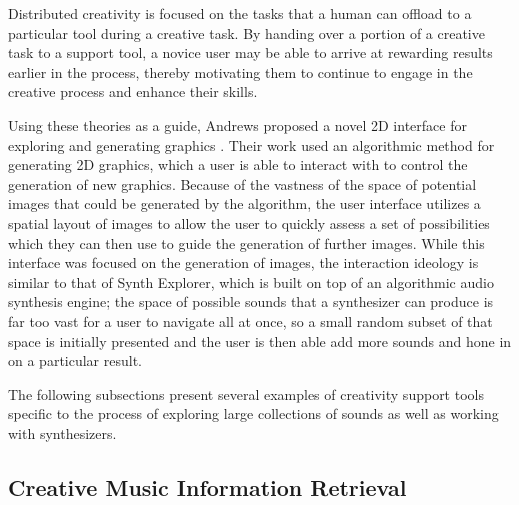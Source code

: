 Distributed creativity is focused on the tasks that a human can offload to a particular tool during a creative task. By handing over a portion of a creative task to a support tool, a novice user may be able to arrive at rewarding results earlier in the process, thereby motivating them to continue to engage in the creative process and enhance their skills.

Using these theories as a guide, Andrews proposed a novel 2D interface for exploring and generating graphics \cite{10.1145/3325480.3325506}. Their work used an algorithmic method for generating 2D graphics, which a user is able to interact with to control the generation of new graphics. Because of the vastness of the space of potential images that could be generated by the algorithm, the user interface utilizes a spatial layout of images to allow the user to quickly assess a set of possibilities which they can then use to guide the generation of further images. While this interface was focused on the generation of images, the interaction ideology is similar to that of Synth Explorer, which is built on top of an algorithmic audio synthesis engine; the space of possible sounds that a synthesizer can produce is far too vast for a user to navigate all at once, so a small random subset of that space is initially presented and the user is then able add more sounds and hone in on a particular result.

The following subsections present several examples of creativity support tools specific to the process of exploring large collections of sounds as well as working with synthesizers.

\subsection{Creative Music Information Retrieval}

